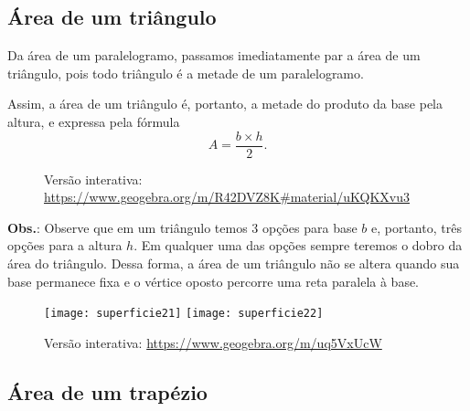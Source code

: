 \subsection{Área de um triângulo}

Da área de um paralelogramo, passamos imediatamente par a área de um triângulo, pois todo triângulo é a metade de um paralelogramo.

Assim, a área de um triângulo é, portanto, a metade do produto da base pela altura, e expressa pela fórmula 
\begin{equation*}
A=\frac{b\times h}{2}.
\end{equation*}

\begin{figure}[H]
\centering


\quad
{}


\caption{Versão interativa: \url{https://www.geogebra.org/m/R42DVZ8K\#material/uKQKXvu3}}
\end{figure}

\textbf{Obs.}: Observe que em um triângulo temos 3 opções para base $b$ e, portanto, três opções para a altura $h$. Em qualquer uma das opções sempre teremos o dobro da área do triângulo. Dessa forma, a área de um triângulo não se altera quando sua base permanece fixa e o vértice oposto percorre uma reta paralela à base.

\begin{figure}[H]
\centering

\texttt{[image: superficie21]}\hspace{1em}
\texttt{[image: superficie22]}

\caption{Versão interativa: \url{https://www.geogebra.org/m/uq5VxUcW}}
\end{figure}

\subsection{ Área de um trapézio}


